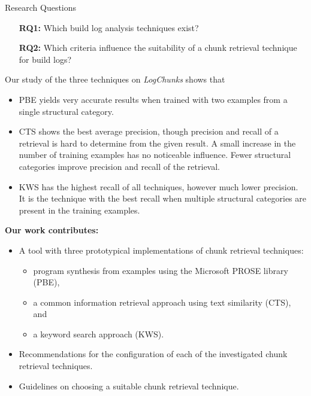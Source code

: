 \begin{simplebox}{Research Questions}
\begin{itemize}
  \item[\textbf{RQ1:}] Which build log analysis techniques exist?
  \item[\textbf{RQ2:}] Which criteria influence the suitability of a chunk retrieval technique for build logs?
\end{itemize}
\end{simplebox}



Our study of the three techniques on \emph{LogChunks} shows that
\begin{itemize}
  \item PBE yields very accurate results when trained with two examples from a single structural category.
  \item CTS shows the best average precision, though precision and recall of a retrieval is hard to determine from the given result.
  A small increase in the number of training examples has no noticeable influence.
  Fewer structural categories improve precision and recall of the retrieval.
  \item KWS has the highest recall of all techniques, however much lower precision.
  It is the technique with the best recall when multiple structural categories are present in the training examples.
\end{itemize}

\noindent
\textbf{Our work contributes:}
\begin{itemize}
  \item A tool with three prototypical implementations of chunk retrieval techniques:
        \begin{itemize}
          \item program synthesis from examples using the Microsoft PROSE library (PBE),
          \item a common information retrieval approach using text similarity (CTS), and
          \item a keyword search approach (KWS).
        \end{itemize}
  \item Recommendations for the configuration of each of the investigated chunk retrieval techniques.
  \item Guidelines on choosing a suitable chunk retrieval technique.
\end{itemize}

